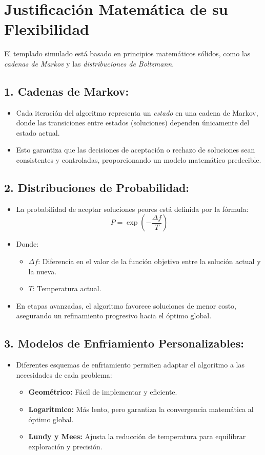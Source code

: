 \documentclass{article}
\begin{document}
\section{Justificación Matemática de su Flexibilidad}

El templado simulado está basado en principios matemáticos sólidos, como las \textit{cadenas de Markov} y las \textit{distribuciones de Boltzmann}.

\subsection{1. Cadenas de Markov:}
\begin{itemize}
    \item Cada iteración del algoritmo representa un \textit{estado} en una cadena de Markov, donde las transiciones entre estados (soluciones) dependen únicamente del estado actual.
    \item Esto garantiza que las decisiones de aceptación o rechazo de soluciones sean consistentes y controladas, proporcionando un modelo matemático predecible.
\end{itemize}

\subsection{2. Distribuciones de Probabilidad:}
\begin{itemize}
    \item La probabilidad de aceptar soluciones peores está definida por la fórmula:
    \[
    P = \exp\left(-\frac{\Delta f}{T}\right)
    \]
    \item Donde:
    \begin{itemize}
        \item $\Delta f$: Diferencia en el valor de la función objetivo entre la solución actual y la nueva.
        \item $T$: Temperatura actual.
    \end{itemize}
    \item En etapas avanzadas, el algoritmo favorece soluciones de menor costo, asegurando un refinamiento progresivo hacia el óptimo global.
\end{itemize}

\subsection{3. Modelos de Enfriamiento Personalizables:}
\begin{itemize}
    \item Diferentes esquemas de enfriamiento permiten adaptar el algoritmo a las necesidades de cada problema:
    \begin{itemize}
        \item \textbf{Geométrico:} Fácil de implementar y eficiente.
        \item \textbf{Logarítmico:} Más lento, pero garantiza la convergencia matemática al óptimo global.
        \item \textbf{Lundy y Mees:} Ajusta la reducción de temperatura para equilibrar exploración y precisión.
    \end{itemize}
\end{itemize}
\end{document}
